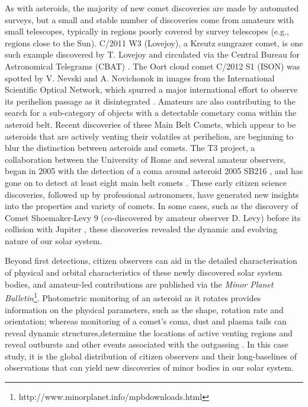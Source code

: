 \documentclass{ar2e}
\begin{document}
As with asteroids, the majority of new comet discoveries are made by automated
surveys, but a small and stable number of discoveries come from amateurs with
small telescopes, typically in regions poorly covered by survey telescopes
(e.g., regions close to the Sun).   C/2011 W3 (Lovejoy), a Kreutz sungrazer
comet, is one such example discovered by T. Lovejoy and circulated via the
Central Bureau for Astronomical Telegrams (CBAT) \citep[e.g.,][]{12sekanina}. 
The Oort cloud comet C/2012 S1 (ISON) was spotted by V. Nevski and A. Novichonok
in images from the International Scientific Optical Network, which spurred a
major international effort to observe its perihelion passage as it disintegrated
\citep{14sekanina}.  Amateurs are also contributing to the search for a
sub-category of objects with a detectable cometary coma within the asteroid
belt.  Recent discoveries of these Main Belt Comets, which appear to be
asteroids that are actively venting their volatiles at perihelion, are beginning
to blur the distinction between asteroids and comets.  The T3 project, a
collaboration between the University of Rome and several amateur observers,
began in 2005 with the detection of a coma around asteroid 2005 SB216
\citep{06buzzi}, and has gone on to detect at least eight main belt comets
\citep{14mousis_proam}.  These early citizen science discoveries, followed up by
professional astronomers, have generated new insights into the properties and
variety of comets.  In some cases, such as the discovery of Comet Shoemaker-Levy
9 (co-discovered by amateur observer D. Levy) before its collision with Jupiter
\citep{04harrington}, these discoveries revealed the dynamic and evolving nature
of our solar system.

Beyond first detections, citizen observers can aid in the detailed
characterisation of physical and orbital characteristics of these newly
discovered solar system bodies, and amateur-led contributions are published via
the \textit{Minor Planet
Bulletin}\footnote{http://www.minorplanet.info/mpbdownloads.html}.  Photometric
monitoring of an asteroid as it rotates provides information on the physical
parameters, such as the shape, rotation rate and orientation; whereas monitoring
of a comet's coma, dust and plasma tails can reveal dynamic structures,determine
the locations of active venting regions and reveal outbursts and other events
associated with the outgassing \citep[see][for a comprehensive
review]{14mousis_proam}.  In this case study, it is the global distribution of
citizen observers and their long-baselines of observations that can yield new
discoveries of minor bodies in our solar system.
\end{document}

